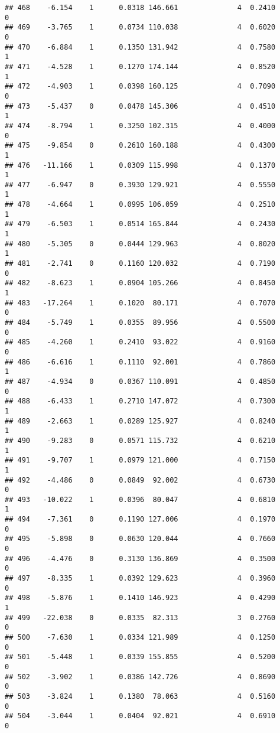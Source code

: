 \documentclass[
]{article}
\begin{document}
\begin{verbatim}
## 468    -6.154    1      0.0318 146.661              4  0.2410      0
## 469    -3.765    1      0.0734 110.038              4  0.6020      0
## 470    -6.884    1      0.1350 131.942              4  0.7580      1
## 471    -4.528    1      0.1270 174.144              4  0.8520      1
## 472    -4.903    1      0.0398 160.125              4  0.7090      0
## 473    -5.437    0      0.0478 145.306              4  0.4510      1
## 474    -8.794    1      0.3250 102.315              4  0.4000      0
## 475    -9.854    0      0.2610 160.188              4  0.4300      1
## 476   -11.166    1      0.0309 115.998              4  0.1370      1
## 477    -6.947    0      0.3930 129.921              4  0.5550      1
## 478    -4.664    1      0.0995 106.059              4  0.2510      1
## 479    -6.503    1      0.0514 165.844              4  0.2430      1
## 480    -5.305    0      0.0444 129.963              4  0.8020      1
## 481    -2.741    0      0.1160 120.032              4  0.7190      0
## 482    -8.623    1      0.0904 105.266              4  0.8450      1
## 483   -17.264    1      0.1020  80.171              4  0.7070      0
## 484    -5.749    1      0.0355  89.956              4  0.5500      0
## 485    -4.260    1      0.2410  93.022              4  0.9160      0
## 486    -6.616    1      0.1110  92.001              4  0.7860      1
## 487    -4.934    0      0.0367 110.091              4  0.4850      0
## 488    -6.433    1      0.2710 147.072              4  0.7300      1
## 489    -2.663    1      0.0289 125.927              4  0.8240      1
## 490    -9.283    0      0.0571 115.732              4  0.6210      1
## 491    -9.707    1      0.0979 121.000              4  0.7150      1
## 492    -4.486    0      0.0849  92.002              4  0.6730      0
## 493   -10.022    1      0.0396  80.047              4  0.6810      1
## 494    -7.361    0      0.1190 127.006              4  0.1970      0
## 495    -5.898    0      0.0630 120.044              4  0.7660      0
## 496    -4.476    0      0.3130 136.869              4  0.3500      0
## 497    -8.335    1      0.0392 129.623              4  0.3960      0
## 498    -5.876    1      0.1410 146.923              4  0.4290      1
## 499   -22.038    0      0.0335  82.313              3  0.2760      0
## 500    -7.630    1      0.0334 121.989              4  0.1250      0
## 501    -5.448    1      0.0339 155.855              4  0.5200      0
## 502    -3.902    1      0.0386 142.726              4  0.8690      0
## 503    -3.824    1      0.1380  78.063              4  0.5160      0
## 504    -3.044    1      0.0404  92.021              4  0.6910      0

\end{verbatim}
\end{document}
